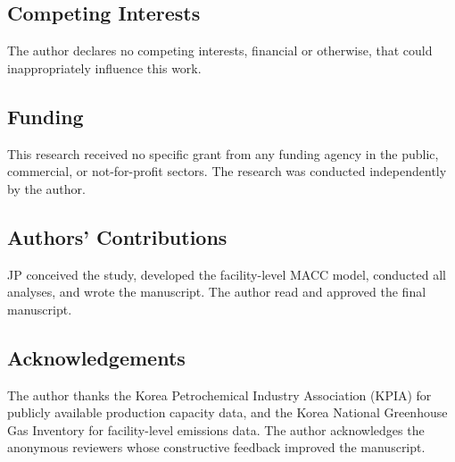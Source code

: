 \documentclass[11pt,a4paper]{article}
\begin{document}
\subsection*{Competing Interests}

The author declares no competing interests, financial or otherwise, that could inappropriately influence this work.

\subsection*{Funding}

This research received no specific grant from any funding agency in the public, commercial, or not-for-profit sectors. The research was conducted independently by the author.

\subsection*{Authors' Contributions}

JP conceived the study, developed the facility-level MACC model, conducted all analyses, and wrote the manuscript. The author read and approved the final manuscript.

\subsection*{Acknowledgements}

The author thanks the Korea Petrochemical Industry Association (KPIA) for publicly available production capacity data, and the Korea National Greenhouse Gas Inventory for facility-level emissions data. The author acknowledges the anonymous reviewers whose constructive feedback improved the manuscript.




\end{document}
